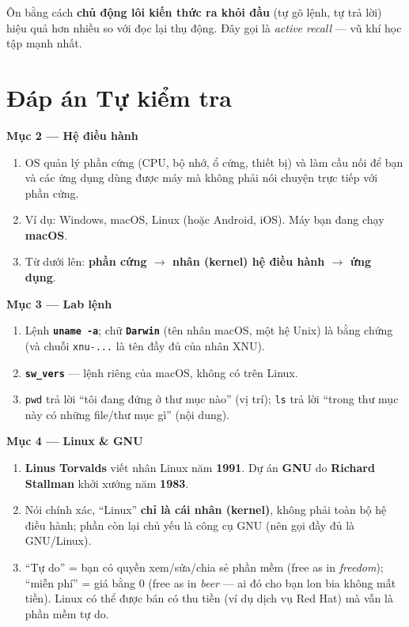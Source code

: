 \documentclass[12pt,a4paper]{article}
\begin{document}
\begin{tipbox}[Mẹo]
Ôn bằng cách \textbf{chủ động lôi kiến thức ra khỏi đầu} (tự gõ lệnh, tự trả lời) hiệu quả hơn nhiều so với đọc lại thụ động. Đây gọi là \textit{active recall} — vũ khí học tập mạnh nhất.
\end{tipbox}

\section{Đáp án Tự kiểm tra}

\textbf{Mục 2 — Hệ điều hành}
\begin{enumerate}[leftmargin=*]
  \item OS quản lý phần cứng (CPU, bộ nhớ, ổ cứng, thiết bị) và làm cầu nối để bạn và các ứng dụng dùng được máy mà không phải nói chuyện trực tiếp với phần cứng.
  \item Ví dụ: Windows, macOS, Linux (hoặc Android, iOS). Máy bạn đang chạy \textbf{macOS}.
  \item Từ dưới lên: \textbf{phần cứng $\rightarrow$ nhân (kernel) hệ điều hành $\rightarrow$ ứng dụng}.
\end{enumerate}

\textbf{Mục 3 — Lab lệnh}
\begin{enumerate}[leftmargin=*]
  \item Lệnh \textbf{\texttt{uname -a}}; chữ \textbf{\texttt{Darwin}} (tên nhân macOS, một hệ Unix) là bằng chứng (và chuỗi \texttt{xnu-...} là tên đầy đủ của nhân XNU).
  \item \textbf{\texttt{sw\_vers}} — lệnh riêng của macOS, không có trên Linux.
  \item \texttt{pwd} trả lời ``tôi đang đứng ở thư mục nào'' (vị trí); \texttt{ls} trả lời ``trong thư mục này có những file/thư mục gì'' (nội dung).
\end{enumerate}

\textbf{Mục 4 — Linux \& GNU}
\begin{enumerate}[leftmargin=*]
  \item \textbf{Linus Torvalds} viết nhân Linux năm \textbf{1991}. Dự án \textbf{GNU} do \textbf{Richard Stallman} khởi xướng năm \textbf{1983}.
  \item Nói chính xác, ``Linux'' \textbf{chỉ là cái nhân (kernel)}, không phải toàn bộ hệ điều hành; phần còn lại chủ yếu là công cụ GNU (nên gọi đầy đủ là GNU/Linux).
  \item ``Tự do'' = bạn có quyền xem/sửa/chia sẻ phần mềm (free as in \textit{freedom}); ``miễn phí'' = giá bằng 0 (free as in \textit{beer} — ai đó cho bạn lon bia không mất tiền). Linux có thể được bán có thu tiền (ví dụ dịch vụ Red Hat) mà vẫn là phần mềm tự do.
\end{enumerate}
\end{document}
